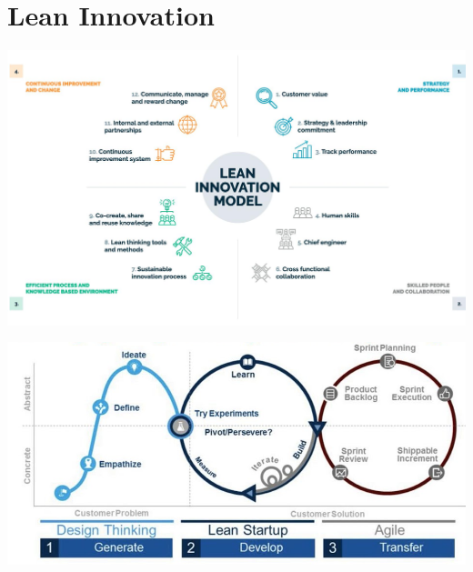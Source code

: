 \documentclass{article}[18pt]
\begin{document}
\section{Lean Innovation}
\begin{center}
	\includegraphics[scale=0.4]{Lean-Innovation}
\end{center}
\begin{center}
	\includegraphics[scale=0.7]{Lean}
\end{center}
\end{document}
